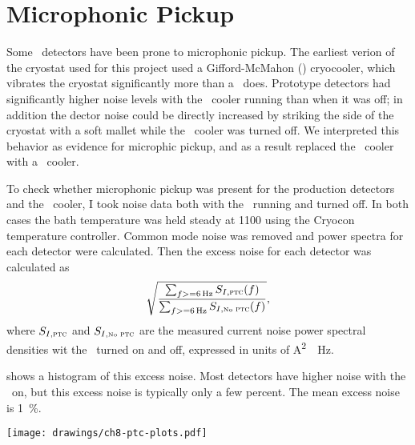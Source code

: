 \section{Microphonic Pickup}

Some \TES\ detectors have been prone to microphonic pickup.
The earliest verion of the cryostat used for this project used a Gifford-McMahon (\GM) cryocooler, which vibrates the cryostat significantly more than a \PTC\ does.
Prototype detectors had significantly higher noise levels with the \GM\ cooler running than when it was off; in addition the dector noise could be directly increased by striking the side of the cryostat with a soft mallet while the \GM\ cooler was turned off.
We interpreted this behavior as evidence for microphic pickup, and as a result replaced the \GM\ cooler with a \PTC\ cooler.

To check whether microphonic pickup was present for the production detectors and the \PTC\ cooler, I took noise data both with the \PTC\ running and turned off.
In both cases the bath temperature was held steady at \SI{1100}{\mK} using the Cryocon temperature controller.
Common mode noise was removed and power spectra for each detector were calculated.
Then the excess noise for each detector was calculated as
\begin{equation}
  \sqrt{  \frac{ \sum_{f >= \SI{6}{\Hz}} S_{I,\textsc{ptc}}(f) }
               { \sum_{f >= \SI{6}{\Hz}} S_{I,\mbox{\tiny{No}}\textsc{ ptc}}(f) }},
\end{equation}
where $S_{I,\textsc{ptc}}$ and $S_{I,\mbox{\tiny{No}}\textsc{ ptc}}$ are the measured current noise power spectral densities wit the \PTC\ turned on and off, expressed in units of \si{\A^2 \per \Hz}.

 shows a histogram of this excess noise. Most detectors have higher noise with the \PTC\ on, but this excess noise is typically only a few percent. 
The mean excess noise is \SI{1}{\percent}.

\begin{figure*}
  \centering
\texttt{[image: drawings/ch8-ptc-plots.pdf]}
\caption{Histogram showing excess noise due to \PTC, defined as ratio of total noise above \SI{6}{\Hz} (see text for precise definition).
More detectors have higher noise with \PTC\ on than off, but the mean exces noise is only \SI{1}{\percent}.
}
\label{fig:ch8-ptc-plots}
\end{figure*}
